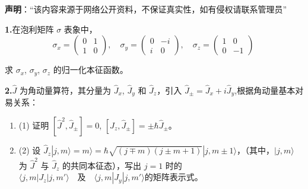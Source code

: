 
\textbf{声明}：“该内容来源于网络公开资料，不保证真实性，如有侵权请联系管理员”

\textbf{1.}在泡利矩阵 $\sigma$ 表象中，
$$\sigma_x = \begin{pmatrix}
0 & 1 \\
1 & 0
\end{pmatrix}, \quad
\sigma_y = \begin{pmatrix}
0 & -i \\
i & 0
\end{pmatrix}, \quad
\sigma_z = \begin{pmatrix}
1 & 0 \\
0 & -1
\end{pmatrix}~$$

求 $\sigma_x$, $\sigma_y$, $\sigma_z$ 的归一化本征函数。

\textbf{2.}$\hat{J}$ 为角动量算符，其分量为 $\hat J_x$, $\hat J_y$ 和 $\hat J_z$，引入 $\hat J_\pm = \hat J_x + i\hat J_y$,根据角动量基本对易关系：

\begin{enumerate}
    \item (1) 证明 $[\hat J^2, \hat J_{\pm}] = 0$, $[\hat J_z, \hat J_{\pm}] = \pm \hbar \hat J_{\pm}$。
    \item (2) 设 $\hat J_z |j, m\rangle = m\rangle = \hbar\sqrt{(j\mp m)(j\pm m+1)}|j, m\pm 1\rangle$，（其中，$|j,m\rangle$ 为 $\hat J^2$ 与 $\hat J_z$ 的共同本征态），写出 $j=1$ 时的 $\langle j, m | J_z | j, m' \rangle \quad \text{及} \quad \langle j, m | J_y | j, m' \rangle $的矩阵表示式。
\end{enumerate}
